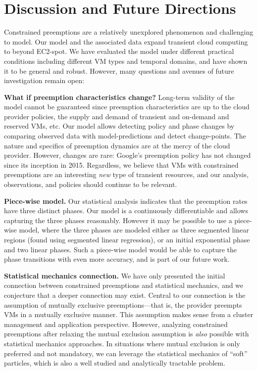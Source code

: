 \section{Discussion and Future Directions}


Constrained preemptions are a relatively unexplored phenomenon and challenging to model.
Our model and the associated data expand transient cloud computing to beyond EC2-spot.
We have evaluated the model under different practical conditions including different VM types and temporal domains, and have shown it to be general and robust. 
However, many questions and avenues of future investigation remain open:

\noindent \textbf{What if preemption characteristics change?} Long-term validity of the model cannot be guaranteed since preemption characteristics are up to the cloud provider policies, the supply and demand of transient and on-demand and reserved VMs, etc. 
Our model allows detecting policy and phase changes by comparing observed data with model-predictions and detect change-points. The nature and specifics of preemption dynamics are at the mercy of the cloud provider. However, changes are rare: Google's preemption policy has not changed since its inception in 2015. 
Regardless, we believe that VMs with constrained preemptions are an interesting \emph{new} type of transient resources, and our analysis, observations, and policies should continue to be relevant. 


\noindent \textbf{Piece-wise model.} Our statistical analysis indicates that the preemption rates have three distinct phases. 
Our model is a continuously differentiable and allows capturing the three phases reasonably. 
However it may be possible to use a piece-wise model, where the three phases are modeled either as three segmented linear regions (found using segmented linear regression), or an initial exponential phase and two linear phases. 
Such a piece-wise model would be able to capture the phase transitions with even more accuracy, and is part of our future work. 

\noindent \textbf{Statistical mechanics connection.} We have only presented the initial connection between constrained preemptions and statistical mechanics, and we conjecture that a deeper connection may exist. 
Central to our connection is the assumption of mutually exclusive preemptions---that is, the provider preempts VMs in a mutually exclusive manner.
This assumption makes sense from a cluster management and application perspective. 
However,  analyzing constrained preemptions after relaxing the mutual exclusion assumption is \emph{also} possible with statistical mechanics approaches. 
In situations where mutual exclusion is only preferred and not mandatory, we can leverage the statistical mechanics of ``soft'' particles, which is also a well studied and analytically tractable problem. 

